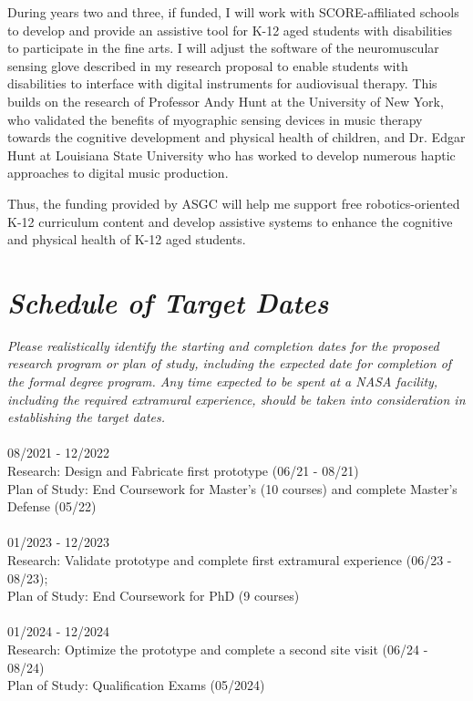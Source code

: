 \documentclass{article}
\begin{document}
During years two and three, if funded, I will work with SCORE-affiliated schools to develop and provide an assistive tool for K-12 aged students with disabilities to participate in the fine arts. I will adjust the software of the neuromuscular sensing glove described in my research proposal to enable students with disabilities to interface with digital instruments for audiovisual therapy. This builds on the research of Professor Andy Hunt at the University of New York, who validated the benefits of myographic sensing devices in music therapy towards the cognitive development and physical health of children, and Dr. Edgar Hunt at Louisiana State University who has worked to develop numerous haptic approaches to digital music production.

Thus, the funding provided by ASGC will help me support free robotics-oriented K-12 curriculum content and develop assistive systems to enhance the cognitive and physical health of K-12 aged students.



\clearpage

\section{\emph{Schedule of Target Dates}} 

\small{\emph{Please realistically identify the starting and completion dates for the proposed research program or plan of study, including the expected date for completion of the formal degree program. Any time expected to be spent at a NASA facility, including the required extramural experience, should be taken into consideration in establishing the target dates.}}
\\
\\
\large
08/2021 - 12/2022 \\
Research: Design and Fabricate first prototype (06/21 - 08/21)\\
Plan of Study: End Coursework for Master’s (10 courses) and complete Master’s Defense (05/22)\\\\

01/2023 - 12/2023 \\
Research: Validate prototype and complete first extramural experience (06/23 - 08/23);\\
Plan of Study: End Coursework for PhD (9 courses) \\\\

01/2024 - 12/2024 \\
Research: Optimize the prototype and complete a second site visit (06/24 - 08/24)\\
Plan of Study: Qualification Exams (05/2024) \\\\
\end{document}
